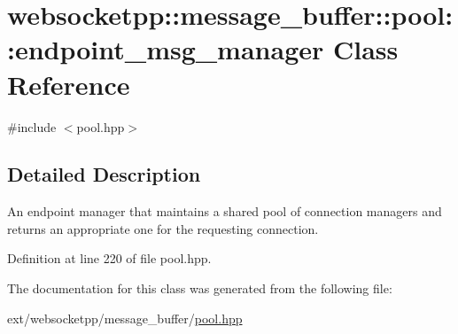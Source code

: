 \hypertarget{classwebsocketpp_1_1message__buffer_1_1pool_1_1endpoint__msg__manager}{}\section{websocketpp\+:\+:message\+\_\+buffer\+:\+:pool\+:\+:endpoint\+\_\+msg\+\_\+manager Class Reference}
\label{classwebsocketpp_1_1message__buffer_1_1pool_1_1endpoint__msg__manager}


{\ttfamily \#include $<$pool.\+hpp$>$}



\subsection{Detailed Description}
An endpoint manager that maintains a shared pool of connection managers and returns an appropriate one for the requesting connection. 

Definition at line 220 of file pool.\+hpp.



The documentation for this class was generated from the following file\+:\begin{DoxyCompactItemize}
\item 
ext/websocketpp/message\+\_\+buffer/\hyperlink{pool_8hpp}{pool.\+hpp}\end{DoxyCompactItemize}
